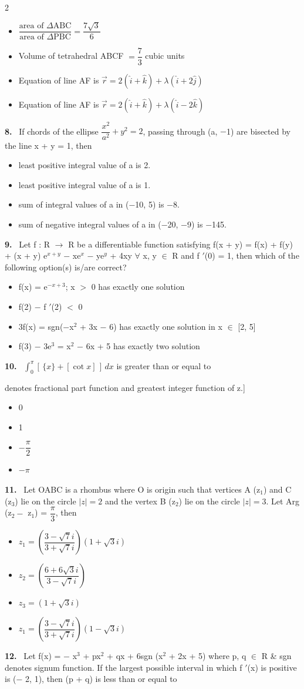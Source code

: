 \documentclass[10pt]{extarticle}
\newcommand{\qn}[1]{\par\smallskip\noindent\textbf{#1.}~}
\newenvironment{qoptions}{\begin{itemize}[leftmargin=1.8em,itemsep=1pt,topsep=2pt,label={}]}{\end{itemize}}
\newcommand{\opt}[2]{\item[(#1)] #2}
\begin{document}
\begin{multicols}{2}
\begin{qoptions}
\opt{A}{$\dfrac{\text{area of }\Delta\mathrm{ABC}}{\text{area of }\Delta\mathrm{PBC}}=\dfrac{7\sqrt3}6$}
\opt{B}{Volume of tetrahedral ABCF $=\dfrac73$ cubic units}
\opt{C}{Equation of line AF is $\vec r=2(\hat i+\hat k)+\lambda(\hat i+2\hat j)$}
\opt{D}{Equation of line AF is $\vec r=2(\hat i+\hat k)+\lambda(\hat i-2\hat k)$}
\end{qoptions}
\qn{8} If chords of the ellipse $\dfrac{x^2}{a^2}+y^2=2$, passing through (a, $-$1) are bisected by the line x + y = 1, then
\begin{qoptions}
\opt{A}{least positive integral value of a is 2.}
\opt{B}{least positive integral value of a is 1.}
\opt{C}{sum of integral values of a in ($-$10, 5) is $-$8.}
\opt{D}{sum of negative integral values of a in ($-$20, $-$9) is $-$145.}
\end{qoptions}
\qn{9} Let f : R $\longrightarrow$ R be a differentiable function satisfying f(x + y) = f(x) + f(y) + (x + y) e$^{x+y}$ $-$ xe$^x$ $-$ ye$^y$ + 4xy $\forall$ x, y $\in$ R and f $'$(0) = 1, then which of the following option(s) is/are correct?
\begin{qoptions}
\opt{A}{f(x) = e$^{-x+3}$; x $>$ 0 has exactly one solution}
\opt{B}{f(2) $-$ f $'$(2) $<$ 0}
\opt{C}{3f(x) = sgn($-$x$^2$ + 3x $-$ 6) has exactly one solution in x $\in$ [2, 5]}
\opt{D}{f(3) $-$ 3e$^3$ = x$^2$ $-$ 6x + 5 has exactly two solution}
\end{qoptions}
\qn{10} $\displaystyle\int_0^{\pi}[\,\{x\}+[\cot x]\,]\,dx$ is greater than or equal to\par
[Note: \{z\} \& [z] denotes fractional part function and greatest integer function of z.]
\begin{qoptions}
\opt{A}{0}
\opt{B}{1}
\opt{C}{$-\dfrac\pi2$}
\opt{D}{$-\pi$}
\end{qoptions}
\qn{11} Let OABC is a rhombus where O is origin such that vertices A (z$_1$) and C (z$_3$) lie on the circle $|z|=2$ and the vertex B (z$_2$) lie on the circle $|z|=3$. Let Arg (z$_2-$ z$_1$) = $\dfrac\pi3$, then
\begin{qoptions}
\opt{A}{$z_1=\left(\dfrac{3-\sqrt7i}{3+\sqrt7i}\right)(1+\sqrt3i)$}
\opt{B}{$z_2=\left(\dfrac{6+6\sqrt3i}{3-\sqrt7i}\right)$}
\opt{C}{$z_3=(1+\sqrt3i)$}
\opt{D}{$z_1=\left(\dfrac{3-\sqrt7i}{3+\sqrt7i}\right)(1-\sqrt3i)$}
\end{qoptions}
\qn{12} Let f(x) = $-$ x$^3$ + px$^2$ + qx + 6sgn (x$^2$ + 2x + 5) where p, q $\in$ R \& sgn denotes signum function. If the largest possible interval in which f $'$(x) is positive is ($-$ 2, 1), then (p + q) is less than or equal to

\end{multicols}
\end{document}
